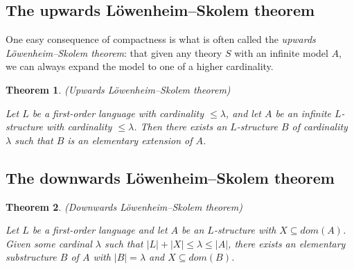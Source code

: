 \documentclass[10pt, a4paper, oneside]{article}
\newtheorem{thm}{Theorem}[section]
\theoremstyle{definition}
\theoremstyle{remark}
\theoremstyle{plain}
\begin{document}
\subsection{The upwards Löwenheim--Skolem theorem}

One easy consequence of compactness is what is often called the \emph{upwards
Löwenheim--Skolem theorem}: that given any theory $S$ with an infinite model
$A$, we can always expand the model to one of a higher cardinality.

\begin{thm}
    (Upwards Löwenheim--Skolem theorem)
    
    Let $L$ be a first-order language with cardinality $\leq \lambda$, and let $A$
    be an infinite $L$-structure with cardinality $\leq \lambda$. Then there
    exists an $L$-structure $B$ of cardinality $\lambda$ such that $B$ is an
    elementary extension of $A$.
\end{thm}

\subsection{The downwards Löwenheim--Skolem theorem}

\begin{thm}
    (Downwards Löwenheim--Skolem theorem)
    
    Let $L$ be a first-order language and let $A$ be an $L$-structure with
    $X \subseteq dom(A)$. Given some cardinal $\lambda$ such that
    $|L| + |X| \leq \lambda \leq |A|$, there exists an elementary substructure
    $B$ of $A$ with $|B| = \lambda$ and $X \subseteq dom(B)$.
\end{thm}




\end{document}
